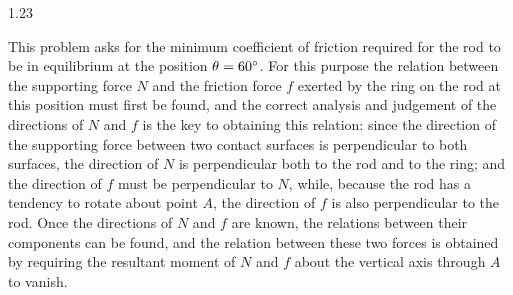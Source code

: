\begin{solution}{1.23}
\begin{commentary}
This problem asks for the minimum coefficient of friction required for the rod to be in equilibrium at the position $\theta=60^{\circ}$. For this purpose the relation between the supporting force $N$ and the friction force $f$ exerted by the ring on the rod at this position must first be found, and the correct analysis and judgement of the directions of $N$ and $f$ is the key to obtaining this relation: since the direction of the supporting force between two contact surfaces is perpendicular to both surfaces, the direction of $N$ is perpendicular both to the rod and to the ring; and the direction of $f$ must be perpendicular to $N$, while, because the rod has a tendency to rotate about point $A$, the direction of $f$ is also perpendicular to the rod. Once the directions of $N$ and $f$ are known, the relations between their components can be found, and the relation between these two forces is obtained by requiring the resultant moment of $N$ and $f$ about the vertical axis through $A$ to vanish.
\end{commentary}

\end{solution}

